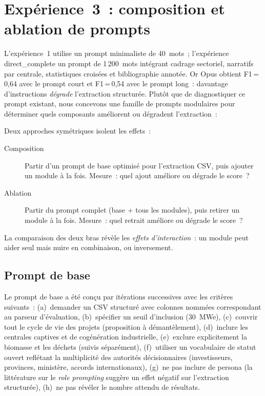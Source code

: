 
\section{Expérience~3~: composition et ablation de prompts}\label{sec:exp3}

L'expérience~1 utilise un prompt minimaliste de 40~mots~; l'expérience direct\_complete
un prompt de 1\,200~mots intégrant cadrage sectoriel, narratifs par centrale,
statistiques croisées et bibliographie annotée. Or Opus obtient F1\,=\,0,64
avec le prompt court et F1\,=\,0,54 avec le prompt long~: davantage
d'instructions \emph{dégrade} l'extraction structurée. Plutôt que de
diagnostiquer ce prompt existant, nous concevons une famille de prompts
modulaires pour déterminer quels composants améliorent ou dégradent
l'extraction~:

Deux approches symétriques isolent les effets~:

\begin{description}
\item[Composition] Partir d'un prompt de base optimisé pour l'extraction CSV,
  puis ajouter un module à la fois. Mesure~: quel ajout améliore ou dégrade le
  score~?
\item[Ablation] Partir du prompt complet (base + tous les modules), puis
  retirer un module à la fois. Mesure~: quel retrait améliore ou dégrade le
  score~?
\end{description}

\noindent La comparaison des deux bras révèle les \emph{effets d'interaction}~:
un module peut aider seul mais nuire en combinaison, ou inversement.

\subsection{Prompt de base}\label{sec:prompt-base}

Le prompt de base a été conçu par itérations successives avec les critères
suivants~: (a)~demander un CSV structuré avec colonnes nommées correspondant
au parseur d'évaluation, (b)~spécifier un seuil d'inclusion (30~MWe),
(c)~couvrir tout le cycle de vie des projets (proposition à démantèlement),
(d)~inclure les centrales captives et de cogénération industrielle,
(e)~exclure explicitement la biomasse et les déchets (suivis séparément),
(f)~utiliser un vocabulaire de statut ouvert reflétant la multiplicité des
autorités décisionnaires (investisseurs, provinces, ministère, accords
internationaux), (g)~ne pas inclure de persona (la littérature sur le
\emph{role prompting} suggère un effet négatif sur l'extraction structurée),
(h)~ne pas révéler le nombre attendu de résultats.

